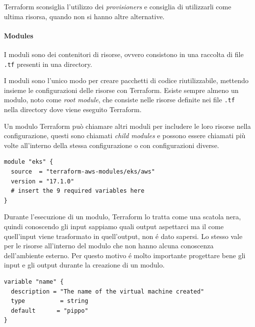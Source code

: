 \documentclass[12pt, a4paper, titlepage]{article}
\newenvironment{code}{\captionsetup{type=listing}}{}
\begin{document}
\begin{tcolorbox}
Terraform sconsiglia l'utilizzo dei \textit{provisioners} e consiglia di utilizzarli come ultima risorsa, quando non si hanno altre alternative. 
\end{tcolorbox}

\paragraph{Modules} 
I moduli sono dei contenitori di risorse, ovvero consistono in una raccolta di file \texttt{.tf} presenti in una directory.

I moduli sono l'unico modo per creare pacchetti di codice riutilizzabile, mettendo insieme le configurazioni delle risorse con Terraform. Esiste sempre almeno un modulo, noto come \textit{root module}, che consiste nelle risorse definite nei file \texttt{.tf} nella directory dove viene eseguito Terraform.

Un modulo Terraform può chiamare altri moduli per includere le loro risorse nella configurazione,  questi sono chiamati \textit{child modules} e possono essere chiamati più volte all'interno della stessa configurazione o con configurazioni diverse. 

\begin{code}
	\begin{verbatim}
module "eks" {
  source  = "terraform-aws-modules/eks/aws"
  version = "17.1.0"
  # insert the 9 required variables here
}
	\end{verbatim}
\end{code}
\bigskip

Durante l'esecuzione di un modulo, Terraform lo tratta come una scatola nera, quindi conoscendo gli input sappiamo quali output aspettarci ma il come quell'input viene trasformato in quell'output, non é dato sapersi. Lo stesso vale per le risorse all'interno del modulo che non hanno alcuna conoscenza dell'ambiente esterno. Per questo motivo é molto importante progettare bene gli input e gli output durante la creazione di un modulo.

\begin{code}
	\begin{verbatim}
variable "name" {
  description = "The name of the virtual machine created"
  type          = string
  default      = "pippo"
}
	\end{verbatim}
\end{code}
\bigskip
\end{document}
